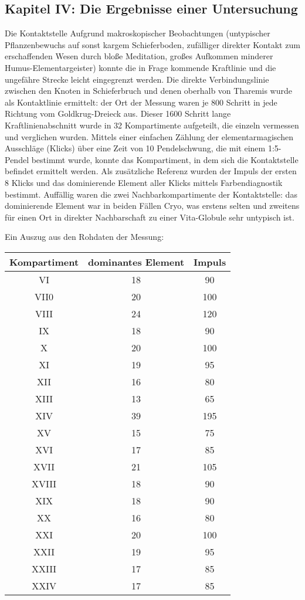 \documentclass[a5paper,8pt]{book}
\begin{document}
\newpage

\subsection{Kapitel IV: Die Ergebnisse einer Untersuchung }

Die Kontaktstelle 
Aufgrund makroskopischer Beobachtungen (untypischer Pflanzenbewuchs auf sonst kargem Schieferboden, zufälliger direkter 
Kontakt zum erschaffenden Wesen durch bloße Meditation, großes Aufkommen minderer Humus-Elementargeister) konnte die in 
Frage kommende Kraftlinie und die ungefähre Strecke leicht eingegrenzt werden. Die direkte Verbindungslinie zwischen den 
Knoten in Schieferbruch und denen oberhalb von Tharemis wurde als Kontaktlinie ermittelt: der Ort der Messung waren je 800 
Schritt in jede Richtung vom Goldkrug-Dreieck aus. Dieser 1600 Schritt lange Kraftlinienabschnitt wurde in 32 Kompartimente 
aufgeteilt, die einzeln vermessen und verglichen wurden. Mittels einer einfachen Zählung der elementarmagischen Ausschläge 
(Klicks) über eine Zeit von 10 Pendelschwung, die mit einem 1:5-Pendel bestimmt wurde, konnte das Kompartiment, in dem sich 
die Kontaktstelle befindet ermittelt werden.
Als zusätzliche Referenz wurden der Impuls der ersten 8 Klicks und das dominierende Element aller Klicks mittels 
Farbendiagnostik bestimmt. Auffällig waren die zwei Nachbarkompartimente der Kontaktstelle: das dominierende Element war 
in beiden Fällen Cryo, was erstens selten und zweitens für einen Ort in direkter Nachbarschaft zu einer Vita-Globule sehr 
untypisch ist. 


Ein Auszug aus den Rohdaten der Messung:

\begin{table}[htbp]
\begin{center}
\begin{tabular}{|c|c|c|}
\hline
Kompartiment	&dominantes Element	&Impuls	\\
\hline
VI	&18	&90	\\
VII0	&20	&100	\\
VIII	&24	&120	\\
IX	&18	&90	\\
X	&20	&100	\\
XI	&19	&95	\\
XII	&16	&80	\\
XIII	&13	&65	\\
XIV	&39	&195	\\
XV	&15	&75	\\
XVI	&17	&85	\\
XVII	&21	&105	\\
XVIII	&18	&90	\\
XIX	&18	&90	\\
XX	&16	&80	\\
XXI	&20	&100	\\
XXII	&19	&95	\\
XXIII	&17	&85	\\
XXIV	&17	&85	\\
\hline
\end{tabular}
\label{Winkel der hochsymmetrischen Achsen zu (111)}
\end{center}
\end{table}
\end{document}

